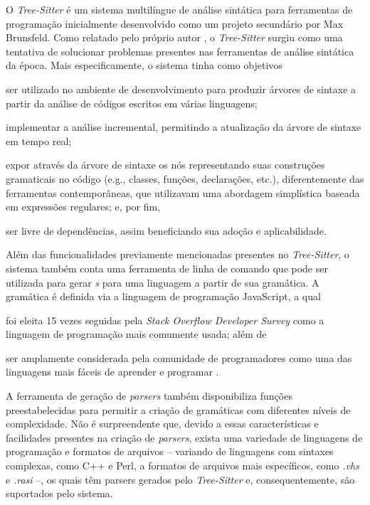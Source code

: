 \documentclass
  [11pt,a4paper,english,brazil,openright,sumario=tradicional,twoside]
  {abntex2}
\newcommand{\treesitter}{\textit{Tree-Sitter}\xspace}
\begin{document}
  O \treesitter é um sistema multilíngue de análise sintática para ferramentas
  de programação inicialmente desenvolvido como um projeto secundário por Max
  Brunsfeld. Como relatado pelo próprio autor \cite{github-2017-tree}, o
  \treesitter surgiu como uma tentativa de solucionar problemas presentes nas
  ferramentas de análise sintática da época. Mais especificamente, o sistema
  tinha como objetivos
  \begin{inparaenum}
    \item ser utilizado no ambiente de desenvolvimento para produzir árvores de
          sintaxe a partir da análise de códigos escritos em várias linguagens;
    \item implementar a análise incremental, permitindo a atualização da árvore
          de sintaxe em tempo real;
    \item expor através da árvore de sintaxe os nós representando suas
          construções gramaticais no código (e.g., classes, funções,
          declarações, etc.), diferentemente das ferramentas contemporâneas,
          que utilizavam uma abordagem simplística baseada em expressões
          regulares; e, por fim,
    \item ser livre de dependências, assim beneficiando sua adoção e
          aplicabilidade.
  \end{inparaenum}

  Além das funcionalidades previamente mencionadas presentes no \treesitter, o
  sistema também conta uma ferramenta de linha de comando que pode ser
  utilizada para gerar \textit{s} para uma linguagem a partir de
  sua gramática. A gramática é definida via a linguagem de programação
  JavaScript, a qual
  \begin{inparaenum}
    \item foi eleita 15 vezes seguidas pela
          \textit{Stack Overflow Developer Survey}
          \cite{stack-overflow-2022-stack} como a linguagem de programação mais
          comumente usada; além de
    \item ser amplamente considerada pela comunidade de programadores como uma
          das linguagens mais fáceis de aprender e programar
          \cites{berkeley-2023-11}{goel-2023-how}{w3schools-2023-javascript}.
  \end{inparaenum}
  A ferramenta de geração de \textit{parsers} também disponibiliza funções
  preestabelecidas para permitir a criação de gramáticas com diferentes níveis
  de complexidade. Não é surpreendente que, devido a essas características e
  facilidades presentes na criação de \textit{parsers}, exista uma variedade de
  linguagens de programação e formatos de arquivos -- variando de linguagens
  com sintaxes complexas, como C++ e Perl, a formatos de arquivos mais
  específicos, como \textit{.vhs} e \textit{.rasi} --, os quais têm parsers
  gerados pelo \treesitter e, consequentemente, são suportados pelo sistema.
\end{document}
